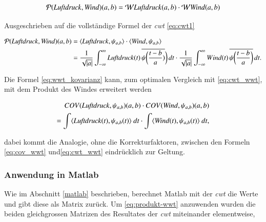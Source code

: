 \begin{refsection}
\begin{equation}
\mathcal{P}(\text{\textit{Luftdruck}},\text{\textit{Wind}})(a,b) = \mathcal{W}\text{\textit{Luftdruck}}(a,b) \cdot \mathcal{W}\text{\textit{Wind}}(a,b)
\label{eq:produkt-wwt}
\end{equation}

Ausgeschrieben auf die vollständige Formel der \textit{cwt} \eqref{eq:cwt1}

\begin{equation}
\begin{split}
\mathcal{P}(\text{\textit{Luftdruck}},\text{\textit{Wind}})(a,b)
& =
\langle \text{\textit{Luftdruck}},\psi_{a,b}\rangle \cdot \langle \text{\textit{Wind}},\psi_{a,b} \rangle \\
& = \frac{1}{\sqrt{|a|}}\int_{-\infty}^\infty \text{\textit{Luftdruck}}(t)\,\overline{
	\psi\biggl(\frac{t-b}{a})}\biggr)\,dt
\cdot
\frac{1}{\sqrt{|a|}}\int_{-\infty}^\infty Wind(t)\,\overline{
	\psi\biggl(\frac{t-b}{a}\biggr)}\,dt .
\label{eq:cwt_wwt}
\end{split}
\end{equation}

Die Formel \eqref{eq:wwt_kovarianz} kann, zum optimalen Vergleich mit \eqref{eq:cwt_wwt}, mit dem Produkt des Windes erweitert werden

\begin{equation}
\begin{split}
COV(\text{\textit{Luftdruck}}, \psi_{a,b})(a,b)\cdot COV(\text{\textit{Wind}}, \psi_{a,b})(a,b) \\ =  \int \langle \text{\textit{Luftdruck}}(t),\psi_{a,b}(t)\rangle \text{\space}dt \cdot \int \langle \text{\textit{Wind}}(t),\psi_{a,b}(t)\rangle \text{\space}dt,
\label{eq:cov_wwt}
\end{split}
\end{equation}

dabei kommt die Analogie, ohne die Korrekturfaktoren, zwischen den Formeln \eqref{eq:cov_wwt} und\eqref{eq:cwt_wwt} eindrücklich zur Geltung.

\subsubsection{Anwendung in Matlab}

Wie im Abschnitt \ref{matlab} beschrieben, berechnet Matlab mit der \textit{cwt} die Werte und gibt diese als Matrix zurück.
Um \eqref{eq:produkt-wwt} anzuwenden wurden die beiden gleichgrossen Matrizen des Resultates der \textit{cwt} miteinander elementweise,


\end{refsection}
